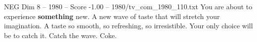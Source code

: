 \begin{textsample}{NEG Dim 8 – 1980 – Score -1.00 – 1980/tv\_com\_1980\_110.txt}  \label{ex:f8_neg_053}
You are about to experience \textbf{something} new.
A new wave of taste that will stretch your imagination.
A taste so smooth, so refreshing, so irresistible.
Your only choice will be to catch it.
Catch the wave.
Coke.

\end{textsample}
